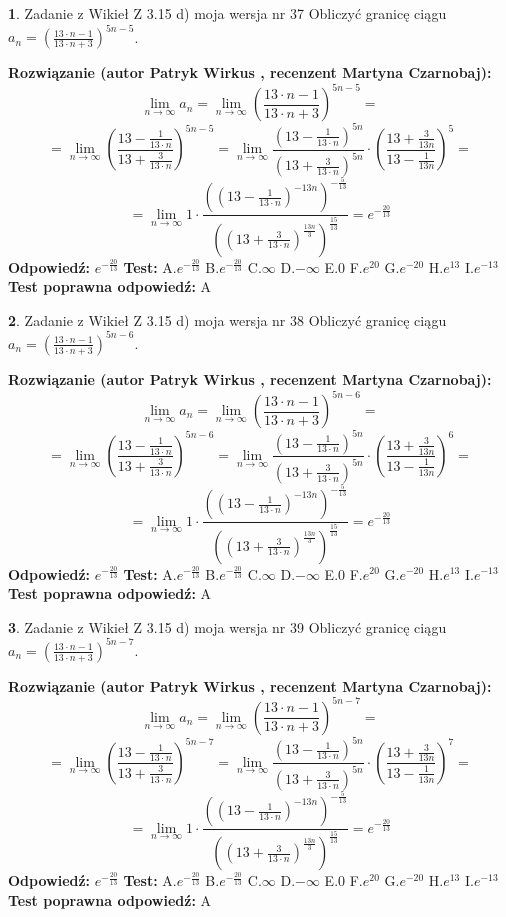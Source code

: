 \documentclass[12pt, a4paper]{article}
\theoremstyle{definition} %
\newtheorem{zad}{}
\newcommand{\zadStart}[1]{\begin{zad}#1\newline}
\newcommand{\zadStop}{\end{zad}}
\newcommand{\rozwStart}[2]{\noindent \textbf{Rozwiązanie (autor #1 , recenzent #2): }\newline}
\newcommand{\rozwStop}{\newline}
\newcommand{\odpStart}{\noindent \textbf{Odpowiedź:}\newline}
\newcommand{\odpStop}{\newline}
\newcommand{\testStart}{\noindent \textbf{Test:}\newline}
\newcommand{\testStop}{\newline}
\newcommand{\kluczStart}{\noindent \textbf{Test poprawna odpowiedź:}\newline}
\newcommand{\kluczStop}{\newline}
\begin{document}
\zadStart{Zadanie z Wikieł Z 3.15 d) moja wersja nr 37}
Obliczyć granicę ciągu $a_{n}=(\frac{13\cdot n - 1}{13 \cdot n + 3})^{5n-5}$.
\zadStop
\rozwStart{Patryk Wirkus}{Martyna Czarnobaj}
$$\lim\limits_{n\to\infty} a_{n} = \lim\limits_{n\to\infty}(\frac{13\cdot n - 1}{13 \cdot n + 3})^{5n-5}=$$
$$=\lim\limits_{n\to\infty}(\frac{13 - \frac{1}{13\cdot n}}{13 + \frac{3}{13 \cdot n}})^{5n-5}=\lim\limits_{n\to\infty}\frac{(13 - \frac{1}{13\cdot n})^{5n}}{(13 + \frac{3}{13\cdot n})^{5n}} \cdot (\frac{13+\frac{3}{13n}}{13-\frac{1}{13n}})^{5}=$$
$$=\lim\limits_{n\to\infty} 1 \cdot \frac{((13-\frac{1}{13 \cdot n})^{-13n})^{-\frac{5}{13}}}{((13+\frac{3}{13 \cdot n})^{\frac{13n}{3}})^{\frac{15}{13}}} =e^{-\frac{20}{13}}$$
\rozwStop
\odpStart
$e^{-\frac{20}{13}}$
\odpStop
\testStart
A.$ e^{-\frac{20}{13}}$
B.$ e^{-\frac{20}{13}}$
C.$\infty$
D.$-\infty$
E.$0$
F.$e^{20}$
G.$e^{-20}$
H.$e^{13}$
I.$e^{-13}$
\testStop
\kluczStart
A
\kluczStop



\zadStart{Zadanie z Wikieł Z 3.15 d) moja wersja nr 38}
Obliczyć granicę ciągu $a_{n}=(\frac{13\cdot n - 1}{13 \cdot n + 3})^{5n-6}$.
\zadStop
\rozwStart{Patryk Wirkus}{Martyna Czarnobaj}
$$\lim\limits_{n\to\infty} a_{n} = \lim\limits_{n\to\infty}(\frac{13\cdot n - 1}{13 \cdot n + 3})^{5n-6}=$$
$$=\lim\limits_{n\to\infty}(\frac{13 - \frac{1}{13\cdot n}}{13 + \frac{3}{13 \cdot n}})^{5n-6}=\lim\limits_{n\to\infty}\frac{(13 - \frac{1}{13\cdot n})^{5n}}{(13 + \frac{3}{13\cdot n})^{5n}} \cdot (\frac{13+\frac{3}{13n}}{13-\frac{1}{13n}})^{6}=$$
$$=\lim\limits_{n\to\infty} 1 \cdot \frac{((13-\frac{1}{13 \cdot n})^{-13n})^{-\frac{5}{13}}}{((13+\frac{3}{13 \cdot n})^{\frac{13n}{3}})^{\frac{15}{13}}} =e^{-\frac{20}{13}}$$
\rozwStop
\odpStart
$e^{-\frac{20}{13}}$
\odpStop
\testStart
A.$ e^{-\frac{20}{13}}$
B.$ e^{-\frac{20}{13}}$
C.$\infty$
D.$-\infty$
E.$0$
F.$e^{20}$
G.$e^{-20}$
H.$e^{13}$
I.$e^{-13}$
\testStop
\kluczStart
A
\kluczStop



\zadStart{Zadanie z Wikieł Z 3.15 d) moja wersja nr 39}
Obliczyć granicę ciągu $a_{n}=(\frac{13\cdot n - 1}{13 \cdot n + 3})^{5n-7}$.
\zadStop
\rozwStart{Patryk Wirkus}{Martyna Czarnobaj}
$$\lim\limits_{n\to\infty} a_{n} = \lim\limits_{n\to\infty}(\frac{13\cdot n - 1}{13 \cdot n + 3})^{5n-7}=$$
$$=\lim\limits_{n\to\infty}(\frac{13 - \frac{1}{13\cdot n}}{13 + \frac{3}{13 \cdot n}})^{5n-7}=\lim\limits_{n\to\infty}\frac{(13 - \frac{1}{13\cdot n})^{5n}}{(13 + \frac{3}{13\cdot n})^{5n}} \cdot (\frac{13+\frac{3}{13n}}{13-\frac{1}{13n}})^{7}=$$
$$=\lim\limits_{n\to\infty} 1 \cdot \frac{((13-\frac{1}{13 \cdot n})^{-13n})^{-\frac{5}{13}}}{((13+\frac{3}{13 \cdot n})^{\frac{13n}{3}})^{\frac{15}{13}}} =e^{-\frac{20}{13}}$$
\rozwStop
\odpStart
$e^{-\frac{20}{13}}$
\odpStop
\testStart
A.$ e^{-\frac{20}{13}}$
B.$ e^{-\frac{20}{13}}$
C.$\infty$
D.$-\infty$
E.$0$
F.$e^{20}$
G.$e^{-20}$
H.$e^{13}$
I.$e^{-13}$
\testStop
\kluczStart
A
\kluczStop
\end{document}
